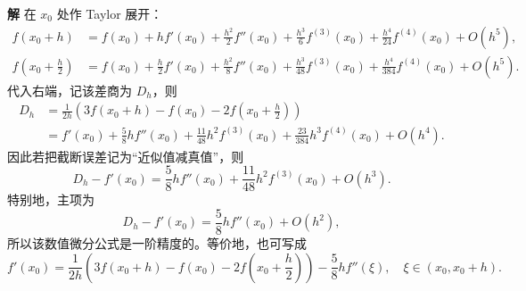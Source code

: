 \documentclass[UTF8,a4paper,11pt]{ctexart}
\begin{document}
\medskip
\noindent\textbf{解}\quad
在 $x_0$ 处作 Taylor 展开：
\[
\begin{aligned}
  f(x_0+h)
  &=f(x_0)+hf'(x_0)+\frac{h^2}{2}f''(x_0)
    +\frac{h^3}{6}f^{(3)}(x_0)
    +\frac{h^4}{24}f^{(4)}(x_0)+O(h^5),\\
  f\!\left(x_0+\frac h2\right)
  &=f(x_0)+\frac h2f'(x_0)+\frac{h^2}{8}f''(x_0)
    +\frac{h^3}{48}f^{(3)}(x_0)
    +\frac{h^4}{384}f^{(4)}(x_0)+O(h^5).
\end{aligned}
\]
代入右端，记该差商为 $D_h$，则
\[
\begin{aligned}
  D_h
  &=\frac{1}{2h}\left(3f(x_0+h)-f(x_0)-2f\!\left(x_0+\frac h2\right)\right)\\
  &=f'(x_0)+\frac58h f''(x_0)
    +\frac{11}{48}h^2 f^{(3)}(x_0)
    +\frac{23}{384}h^3 f^{(4)}(x_0)+O(h^4).
\end{aligned}
\]
因此若把截断误差记为“近似值减真值”，则
\[
  \boxed{
  D_h-f'(x_0)
  =\frac58h f''(x_0)+\frac{11}{48}h^2 f^{(3)}(x_0)+O(h^3).}
\]
特别地，主项为
\[
  D_h-f'(x_0)=\frac58h f''(x_0)+O(h^2),
\]
所以该数值微分公式是一阶精度的。等价地，也可写成
\[
  f'(x_0)
  =
  \frac{1}{2h}\left(3f(x_0+h)-f(x_0)-2f\!\left(x_0+\frac h2\right)\right)
  -\frac58h f''(\xi),
  \quad \xi\in(x_0,x_0+h).
\]
\end{document}

